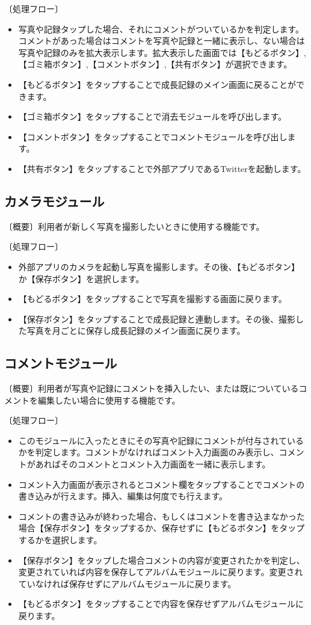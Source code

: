 \documentclass[a4j]{jarticle}
\begin{document}
〔処理フロー〕
\begin{itemize}
\item 写真や記録タップした場合、それにコメントがついているかを判定します。コメントがあった場合はコメントを写真や記録と一緒に表示し、ない場合は写真や記録のみを拡大表示します。拡大表示した画面では【もどるボタン】,【ゴミ箱ボタン】,【コメントボタン】,【共有ボタン】が選択できます。
\item 【もどるボタン】をタップすることで成長記録のメイン画面に戻ることができます。
\item 【ゴミ箱ボタン】をタップすることで消去モジュールを呼び出します。
\item 【コメントボタン】をタップすることでコメントモジュールを呼び出します。
\item 【共有ボタン】をタップすることで外部アプリであるTwitterを起動します。
\end{itemize}

\subsection{カメラモジュール}
〔概要〕利用者が新しく写真を撮影したいときに使用する機能です。

〔処理フロー〕
\begin{itemize}
\item 外部アプリのカメラを起動し写真を撮影します。その後、【もどるボタン】か【保存ボタン】を選択します。
\item 【もどるボタン】をタップすることで写真を撮影する画面に戻ります。
\item 【保存ボタン】をタップすることで成長記録と連動します。その後、撮影した写真を月ごとに保存し成長記録のメイン画面に戻ります。
\end{itemize}

\subsection{コメントモジュール}
〔概要〕利用者が写真や記録にコメントを挿入したい、または既についているコメントを編集したい場合に使用する機能です。

〔処理フロー〕
\begin{itemize}
\item このモジュールに入ったときにその写真や記録にコメントが付与されているかを判定します。コメントがなければコメント入力画面のみ表示し、コメントがあればそのコメントとコメント入力画面を一緒に表示します。
\item コメント入力画面が表示されるとコメント欄をタップすることでコメントの書き込みが行えます。挿入、編集は何度でも行えます。
\item コメントの書き込みが終わった場合、もしくはコメントを書き込まなかった場合【保存ボタン】をタップするか、保存せずに【もどるボタン】をタップするかを選択します。
\item 【保存ボタン】をタップした場合コメントの内容が変更されたかを判定し、変更されていれば内容を保存してアルバムモジュールに戻ります。変更されていなければ保存せずにアルバムモジュールに戻ります。
\item 【もどるボタン】をタップすることで内容を保存せずアルバムモジュールに戻ります。
\end{itemize}
\end{document}
